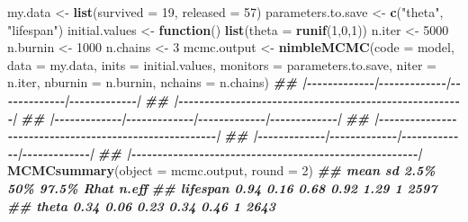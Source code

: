 \documentclass[
  12pt,
]{krantz}
\newenvironment{Shaded}{\begin{snugshade}}{\end{snugshade}}
\newcommand{\AttributeTok}[1]{\textcolor[rgb]{0.13,0.29,0.53}{#1}}
\newcommand{\ControlFlowTok}[1]{\textcolor[rgb]{0.13,0.29,0.53}{\textbf{#1}}}
\newcommand{\DecValTok}[1]{\textcolor[rgb]{0.00,0.00,0.81}{#1}}
\newcommand{\DocumentationTok}[1]{\textcolor[rgb]{0.56,0.35,0.01}{\textbf{\textit{#1}}}}
\newcommand{\FunctionTok}[1]{\textcolor[rgb]{0.13,0.29,0.53}{\textbf{#1}}}
\newcommand{\NormalTok}[1]{#1}
\newcommand{\OtherTok}[1]{\textcolor[rgb]{0.56,0.35,0.01}{#1}}
\newcommand{\StringTok}[1]{\textcolor[rgb]{0.31,0.60,0.02}{#1}}
\begin{document}
\begin{Shaded}
\begin{Highlighting}[]
\NormalTok{my.data }\OtherTok{\textless{}{-}} \FunctionTok{list}\NormalTok{(}\AttributeTok{survived =} \DecValTok{19}\NormalTok{, }\AttributeTok{released =} \DecValTok{57}\NormalTok{)}
\NormalTok{parameters.to.save }\OtherTok{\textless{}{-}} \FunctionTok{c}\NormalTok{(}\StringTok{"theta"}\NormalTok{, }\StringTok{"lifespan"}\NormalTok{)}
\NormalTok{initial.values }\OtherTok{\textless{}{-}} \ControlFlowTok{function}\NormalTok{() }\FunctionTok{list}\NormalTok{(}\AttributeTok{theta =} \FunctionTok{runif}\NormalTok{(}\DecValTok{1}\NormalTok{,}\DecValTok{0}\NormalTok{,}\DecValTok{1}\NormalTok{))}
\NormalTok{n.iter }\OtherTok{\textless{}{-}} \DecValTok{5000}
\NormalTok{n.burnin }\OtherTok{\textless{}{-}} \DecValTok{1000}
\NormalTok{n.chains }\OtherTok{\textless{}{-}} \DecValTok{3}
\NormalTok{mcmc.output }\OtherTok{\textless{}{-}} \FunctionTok{nimbleMCMC}\NormalTok{(}\AttributeTok{code =}\NormalTok{ model,}
                          \AttributeTok{data =}\NormalTok{ my.data,}
                          \AttributeTok{inits =}\NormalTok{ initial.values,}
                          \AttributeTok{monitors =}\NormalTok{ parameters.to.save,}
                          \AttributeTok{niter =}\NormalTok{ n.iter,}
                          \AttributeTok{nburnin =}\NormalTok{ n.burnin,}
                          \AttributeTok{nchains =}\NormalTok{ n.chains)}
\DocumentationTok{\#\# |{-}{-}{-}{-}{-}{-}{-}{-}{-}{-}{-}{-}{-}|{-}{-}{-}{-}{-}{-}{-}{-}{-}{-}{-}{-}{-}|{-}{-}{-}{-}{-}{-}{-}{-}{-}{-}{-}{-}{-}|{-}{-}{-}{-}{-}{-}{-}{-}{-}{-}{-}{-}{-}|}
\DocumentationTok{\#\# |{-}{-}{-}{-}{-}{-}{-}{-}{-}{-}{-}{-}{-}{-}{-}{-}{-}{-}{-}{-}{-}{-}{-}{-}{-}{-}{-}{-}{-}{-}{-}{-}{-}{-}{-}{-}{-}{-}{-}{-}{-}{-}{-}{-}{-}{-}{-}{-}{-}{-}{-}{-}{-}{-}{-}|}
\DocumentationTok{\#\# |{-}{-}{-}{-}{-}{-}{-}{-}{-}{-}{-}{-}{-}|{-}{-}{-}{-}{-}{-}{-}{-}{-}{-}{-}{-}{-}|{-}{-}{-}{-}{-}{-}{-}{-}{-}{-}{-}{-}{-}|{-}{-}{-}{-}{-}{-}{-}{-}{-}{-}{-}{-}{-}|}
\DocumentationTok{\#\# |{-}{-}{-}{-}{-}{-}{-}{-}{-}{-}{-}{-}{-}{-}{-}{-}{-}{-}{-}{-}{-}{-}{-}{-}{-}{-}{-}{-}{-}{-}{-}{-}{-}{-}{-}{-}{-}{-}{-}{-}{-}{-}{-}{-}{-}{-}{-}{-}{-}{-}{-}{-}{-}{-}{-}|}
\DocumentationTok{\#\# |{-}{-}{-}{-}{-}{-}{-}{-}{-}{-}{-}{-}{-}|{-}{-}{-}{-}{-}{-}{-}{-}{-}{-}{-}{-}{-}|{-}{-}{-}{-}{-}{-}{-}{-}{-}{-}{-}{-}{-}|{-}{-}{-}{-}{-}{-}{-}{-}{-}{-}{-}{-}{-}|}
\DocumentationTok{\#\# |{-}{-}{-}{-}{-}{-}{-}{-}{-}{-}{-}{-}{-}{-}{-}{-}{-}{-}{-}{-}{-}{-}{-}{-}{-}{-}{-}{-}{-}{-}{-}{-}{-}{-}{-}{-}{-}{-}{-}{-}{-}{-}{-}{-}{-}{-}{-}{-}{-}{-}{-}{-}{-}{-}{-}|}
\FunctionTok{MCMCsummary}\NormalTok{(}\AttributeTok{object =}\NormalTok{ mcmc.output, }\AttributeTok{round =} \DecValTok{2}\NormalTok{)}
\DocumentationTok{\#\#          mean   sd 2.5\%  50\% 97.5\% Rhat n.eff}
\DocumentationTok{\#\# lifespan 0.94 0.16 0.68 0.92  1.29    1  2597}
\DocumentationTok{\#\# theta    0.34 0.06 0.23 0.34  0.46    1  2643}
\end{Highlighting}
\end{Shaded}
\end{document}
